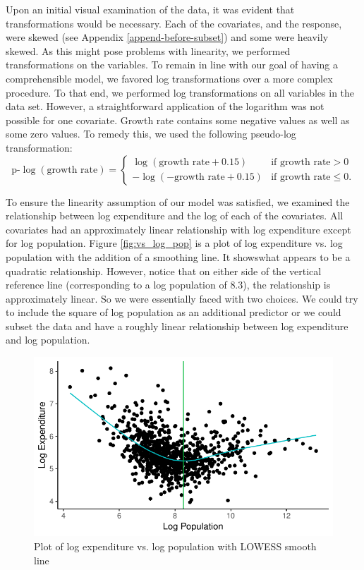 \documentclass{article}\usepackage[]{graphicx}\usepackage[]{color}
\makeatletter
\def\maxwidth{ %
  \ifdim\Gin@nat@width>\linewidth
    \linewidth
  \else
    \Gin@nat@width
  \fi
}
\newenvironment{knitrout}{}{} %
\makeatother
\begin{document}
Upon an initial visual examination of the data, it was evident that transformations would be necessary. Each of the covariates, and the response, were skewed (see Appendix \ref{append-before-subset}) and some were heavily skewed. As this might pose problems with linearity, we performed transformations on the variables. To remain in line with our goal of having a comprehensible model, we favored log transformations over a more complex procedure. To that end, we performed log transformations on all variables in the data set.  However, a straightforward application of the logarithm was not possible for one covariate. Growth rate contains some negative values as well as some zero values. To remedy this, we used the following pseudo-log transformation:
\[
\text{p-}\log(\text{growth rate}) = %
  \begin{cases}
    \log(\text{growth rate} + 0.15) &\text{if growth rate} > 0 \\
    -\log(-\text{growth rate} + 0.15) &\text{if growth rate} \le 0.
  \end{cases}
\]

To ensure the linearity assumption of our model was satisfied, we examined the relationship between log expenditure and the log of each of the covariates. All covariates had an approximately linear relationship with log expenditure except for log population. Figure \ref{fig:vs_log_pop} is a plot of log expenditure vs. log population with the addition of a smoothing line. It showswhat appears to be a quadratic relationship. However, notice that on either side of the vertical reference line (corresponding to a log population of $8.3$), the relationship is approximately linear. So we were essentially faced with two choices. We could try to include the square of log population as an additional predictor or we could subset the data and have a roughly linear relationship between log expenditure and log population.


\begin{knitrout}
\color{fgcolor}\begin{figure}[h]
\includegraphics[width=\maxwidth]{figure/r_fig_vs_log_pop-1} \caption{\label{fig:vs_log_pop} Plot of log expenditure vs. log population with LOWESS smooth line}\label{fig:r fig_vs_log_pop}
\end{figure}


\end{knitrout}
\end{document}
